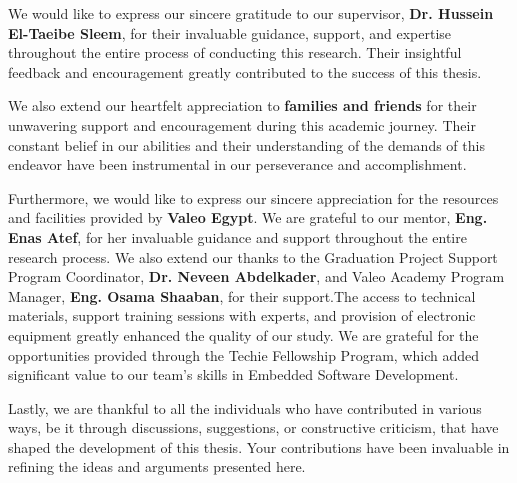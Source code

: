 We would like to express our sincere gratitude to our supervisor, \textbf{Dr. Hussein El-Taeibe Sleem}, for their invaluable guidance, support, and expertise throughout the entire process of conducting this research. Their insightful feedback and encouragement greatly contributed to the success of this thesis.

We also extend our heartfelt appreciation to \textbf{families and friends} for their unwavering support and encouragement during this academic journey. Their constant belief in our abilities and their understanding of the demands of this endeavor have been instrumental in our perseverance and accomplishment.

Furthermore, we would like to express our sincere appreciation for the resources and facilities provided by \textbf{Valeo Egypt}. We are grateful to our mentor, \textbf{Eng. Enas Atef}, for her invaluable guidance and support throughout the entire research process. We also extend our thanks to the Graduation Project Support Program Coordinator, \textbf{Dr. Neveen Abdelkader}, and Valeo Academy Program Manager, \textbf{Eng. Osama Shaaban}, for their support.The access to technical materials, support training sessions with experts, and provision of electronic equipment greatly enhanced the quality of our study. We are grateful for the opportunities provided through the Techie Fellowship Program, which added significant value to our team's skills in Embedded Software Development.

Lastly, we are thankful to all the individuals who have contributed in various ways, be it through discussions, suggestions, or constructive criticism, that have shaped the development of this thesis. Your contributions have been invaluable in refining the ideas and arguments presented here.